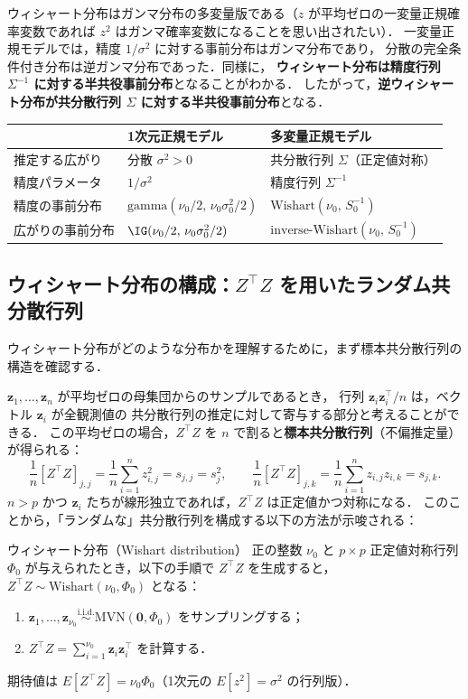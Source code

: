 \documentclass[lualatex,ja=standard,a4paper,12pt]{bxjsarticle}
\newcommand{\mvn}{\mathrm{MVN}}
\newcommand{\IW}{\mathrm{inverse\text{-}Wishart}}
\begin{document}
ウィシャート分布はガンマ分布の多変量版である（$z$ が平均ゼロの一変量正規確率変数であれば $z^2$ はガンマ確率変数になることを思い出されたい）．
一変量正規モデルでは，精度 $1/\sigma^2$ に対する事前分布はガンマ分布であり，
分散の完全条件付き分布は逆ガンマ分布であった．同様に，
\textbf{ウィシャート分布は精度行列 $\Sigma^{-1}$ に対する半共役事前分布}となることがわかる．
したがって，\textbf{逆ウィシャート分布が共分散行列 $\Sigma$ に対する半共役事前分布}となる．

\begin{center}
\renewcommand{\arraystretch}{1.5}
\begin{tabular}{lll}
\toprule
 & 1次元正規モデル & 多変量正規モデル \\
\midrule
推定する広がり & 分散 $\sigma^2 > 0$ & 共分散行列 $\Sigma$（正定値対称）\\
精度パラメータ & $1/\sigma^2$ & 精度行列 $\Sigma^{-1}$ \\
精度の事前分布 & $\mathrm{gamma}(\nu_0/2,\, \nu_0\sigma_0^2/2)$ & $\mathrm{Wishart}(\nu_0,\, S_0^{-1})$ \\
広がりの事前分布 & $\IG(\nu_0/2,\, \nu_0\sigma_0^2/2)$ & $\IW(\nu_0,\, S_0^{-1})$ \\
\bottomrule
\end{tabular}
\end{center}

\subsection{ウィシャート分布の構成：$Z^\top Z$ を用いたランダム共分散行列}

ウィシャート分布がどのような分布かを理解するために，まず標本共分散行列の構造を確認する．

$\bm{z}_1, \ldots, \bm{z}_n$ が平均ゼロの母集団からのサンプルであるとき，
行列 $\bm{z}_i\bm{z}_i^\top / n$ は，ベクトル $\bm{z}_i$ が全観測値の
共分散行列の推定に対して寄与する部分と考えることができる．
この平均ゼロの場合，$Z^\top Z$ を $n$ で割ると\textbf{標本共分散行列}（不偏推定量）が得られる：
\[
  \frac{1}{n}[Z^\top Z]_{j,j}
  = \frac{1}{n}\sum_{i=1}^n z_{i,j}^2
  = s_{j,j} = s_j^2,
  \qquad
  \frac{1}{n}[Z^\top Z]_{j,k}
  = \frac{1}{n}\sum_{i=1}^n z_{i,j}z_{i,k}
  = s_{j,k}.
\]
$n > p$ かつ $\bm{z}_i$ たちが線形独立であれば，$Z^\top Z$ は正定値かつ対称になる．
このことから，「ランダムな」共分散行列を構成する以下の方法が示唆される：

\begin{defbox}{ウィシャート分布（Wishart distribution）}
正の整数 $\nu_0$ と $p \times p$ 正定値対称行列 $\Phi_0$ が与えられたとき，以下の手順で
$Z^\top Z$ を生成すると，$Z^\top Z \sim \mathrm{Wishart}(\nu_0, \Phi_0)$ となる：
\begin{enumerate}
  \item $\bm{z}_1, \ldots, \bm{z}_{\nu_0} \overset{\mathrm{i.i.d.}}{\sim} \mvn(\bm{0}, \Phi_0)$ をサンプリングする；
  \item $Z^\top Z = \sum_{i=1}^{\nu_0} \bm{z}_i\bm{z}_i^\top$ を計算する．
\end{enumerate}
期待値は $E[Z^\top Z] = \nu_0 \Phi_0$（1次元の $E[z^2] = \sigma^2$ の行列版）．
\end{defbox}
\end{document}
